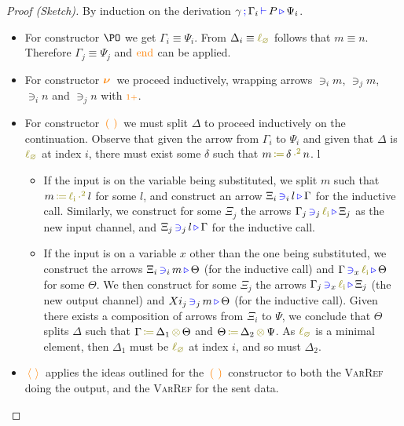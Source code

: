 \begin{proof}[Proof (Sketch)]
  By induction on the derivation $\gamma \, \textcolor{blue}{\operatorname{;}} \, \Gamma_i \, \textcolor{blue}{\operatorname{\vdash}} \, P \, \textcolor{blue}{\operatorname{\triangleright}} \, \Psi_i$.
  \begin{itemize}
    \item
      For constructor $\PO$ we get $\Gamma_i \equiv \Psi_i$.
      From $\Delta_i \equiv \lz$ follows that $m \equiv n$.
      Therefore $\Gamma_j \equiv \Psi_j$ and $\textcolor{orange}{\operatorname{end}}$ can be applied.

    \item
      For constructor $\textcolor{orange}{\operatorname{\boldsymbol{\nu}}} \,$ we proceed inductively, wrapping arrows $\ni_i m$, $\ni_j m$, $\ni_i n$ and $\ni_j n$ with $\textcolor{orange}{\operatorname{\scriptstyle 1+}}$.
      
    \item
      For constructor $\, \textcolor{orange}{\operatorname{\mathbb{(}}} \,  \, \textcolor{orange}{\operatorname{\mathbb{)}}} \,$ we must split $\Delta$ to proceed inductively on the continuation.
      Observe that given the arrow from $\Gamma_i$ to $\Psi_i$ and given that $\Delta$ is $\lz$ at index $i$, there must exist some $\delta$ such that $\opsquared{m}{\delta}{n}$.
 l     \begin{itemize}
        \item
          If the input is on the variable being substituted, we split $m$ such that $\opsquared{m}{\li}{l}$ for some $l$, and construct an arrow $\Xi_i \, \textcolor{blue}{\operatorname{\ni}}_{i} \, l \, \textcolor{blue}{\operatorname{\triangleright}} \, \Gamma$ for the inductive call.
          Similarly, we construct for some $\Xi_j$ the arrows $\containsusage{\Gamma_j}{j}{\li}{\Xi_j}$ as the new input channel, and $\Xi_j \, \textcolor{blue}{\operatorname{\ni}}_{j} \, l \, \textcolor{blue}{\operatorname{\triangleright}} \, \Gamma$ for the inductive call.
        \item
          If the input is on a variable $x$ other than the one being substituted, we construct the arrows $\Xi_i \, \textcolor{blue}{\operatorname{\ni}}_{i} \, m \, \textcolor{blue}{\operatorname{\triangleright}} \, \Theta$ (for the inductive call) and $\containsusage{\Gamma}{x}{\li}{\Theta}$ for some $\Theta$.
          We then construct for some $\Xi_j$ the arrows $\containsusage{\Gamma_j}{x}{\li}{\Xi_j}$ (the new output channel) and $Xi_j \, \textcolor{blue}{\operatorname{\ni}}_{j} \, m \, \textcolor{blue}{\operatorname{\triangleright}} \, \Theta$ (for the inductive call).
          Given there exists a composition of arrows from $\Xi_i$ to $\Psi$, we conclude that $\Theta$ splits $\Delta$ such that $\opctx{\Gamma}{\Delta_1}{\Theta}$ and $\opctx{\Theta}{\Delta_2}{\Psi}$.
          As $\lz$ is a minimal element, then $\Delta_1$ must be $\lz$ at index $i$, and so must $\Delta_2$.
      \end{itemize}

    \item
      $\, \textcolor{orange}{\operatorname{\langle}} \,  \,\textcolor{orange}{\operatorname{\rangle}} \,$ applies the ideas outlined for the $\, \textcolor{orange}{\operatorname{\mathbb{(}}} \,  \, \textcolor{orange}{\operatorname{\mathbb{)}}} \,$ constructor to both the \textsc{VarRef} doing the output, and the \textsc{VarRef} for the sent data.


\end{itemize}
\end{proof}
